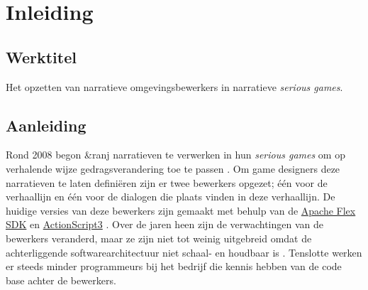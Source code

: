 \documentclass{report}
\newcommand{\organisation}{\&ranj}
\begin{document}
\newpage

\tableofcontents

\chapter{Inleiding}
\section{Werktitel}
Het opzetten van narratieve omgevingsbewerkers in narratieve \emph{serious games}.

\section{Aanleiding} %

Rond 2008 begon \organisation{} narratieven te verwerken in hun \emph{serious games} om op verhalende wijze gedragsverandering toe te passen \cite{interviewivo}. Om game designers deze narratieven te laten defini{\"e}ren zijn er twee bewerkers opgezet; {\'e}{\'e}n voor de verhaallijn en {\'e}{\'e}n voor de dialogen die plaats vinden in deze verhaallijn. De huidige versies van deze bewerkers zijn gemaakt met behulp van de \href{https://en.wikipedia.org/wiki/Apache_Flex}{Apache Flex SDK} en \href{http://www.adobe.com/devnet/actionscript/articles/actionscript3_overview.html}{ActionScript3} \cite{interviewivo}.
Over de jaren heen zijn de verwachtingen van de bewerkers veranderd, maar ze zijn niet tot weinig uitgebreid omdat de achterliggende softwarearchitectuur niet schaal- en houdbaar is \cite{interviewivo}. Tenslotte werken er steeds minder programmeurs bij het bedrijf die kennis hebben van de code base achter de bewerkers.
\end{document}
